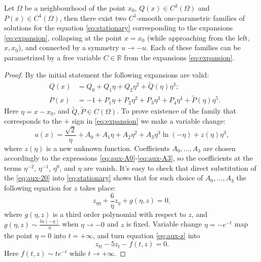 \begin{proposition}
	Let $\Omega$ be a neighbourhood of the point $x_0$, $Q(x) \in C^3(\Omega)$ and $P(x) \in C^4(\Omega)$, then there exist two $C^1$-smooth one-parametric families of solutions for the equation \eqref{eq:stationary} corresponding to the expansions \eqref{eq:expansion}, collapsing at the point $x = x_0$ (while approaching from the left, $x , x_0$), and connected by a symmetry $u \to -u$.
	Each of these families can be parametrized by a free variable $C \in \mathbb{R}$ from the expansions \eqref{eq:expansion}.
\end{proposition}
\begin{proof}
	By the initial statement the following expansions are valid:
	\begin{eqnarray}
		& Q(x) & = Q_0 + Q_1 \eta + Q_2 \eta^2 + \widetilde{Q}(\eta) \eta^3; \\
		& P(x) & = -1 + P_1 \eta + P_2 \eta^2 + P_3 \eta^3 + P_4 \eta^4 + \widetilde{P}(\eta) \eta^5.
	\end{eqnarray}
	Here $\eta = x - x_0$, and $\widetilde{Q}, \widetilde{P} \in C(\Omega)$.
	To prove existence of the family that corresponds to the $+$ sign in \eqref{eq:expansion}	 we make a variable change:
	\begin{equation}
		u(x) = \dfrac{\sqrt{2}}{\eta} + A_0 + A_1 \eta + A_2 \eta^2 + A_3 \eta^3 \ln(-\eta) + z(\eta) \eta^3,
		\label{eq:aux-20}
	\end{equation}
	where $z(\eta)$ is a new unknown function.
	Coefficients $A_0, \dots, A_3$ are chosen accordingly to the expressions \eqref{eq:aux-A0}-\eqref{eq:aux-A3}, so the coefficients at the terms $\eta^{-2}$, $\eta^{-1}$, $\eta^0$, and $\eta$ are vanish.
	It's easy to check that direct substitution of the \eqref{eq:aux-20} into \eqref{eq:stationary} shows that for such choice of $A_0, \dots, A_3$ the following equation for $z$ takes place:
	\begin{equation}
		z_{\eta\eta} + \dfrac{6}{\eta} z_{\eta} + g(\eta, z) = 0,
		\label{eq:aux-z}
	\end{equation}
	where $g(\eta, z)$ is a third order polynomial with respect to $z$, and $g(\eta, z) \sim \frac{ln(-\eta)}{\eta}$ when $\eta \to -0$ and $z$ is fixed.
	Variable change $\eta = -e^{-t}$ map the point $\eta = 0$ into $t = +\infty$, and turn equation \eqref{eq:aux-z} into
	\begin{equation}
		z_{tt} - 5z_t - f(t, z) = 0.
		\label{eq:aux-zt}
	\end{equation}
	Here $f(t, z) \sim t e^{-t}$ while $t \to +\infty$.

\end{proof}
